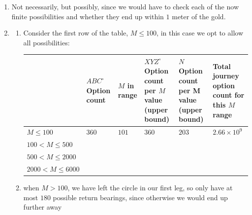 \documentclass{article}
\begin{document}
\begin{enumerate}
    Not all of these combinations will end up within $101$km of the start, but all those unique journeys that do are included here.

    Thus there are at most $360\times6000\times360\times203 \approx 1.58\times10^{11}$ unique final destinations within $101$km of the start.

    \item Not necessarily, but possibly, since we would have to check each of the now finite possibilities and whether they end up within $1$ meter of the gold.

    \item 

    \begin{enumerate}
        \item Consider the first row of the table, $M\leq100$, in this case we opt to allow all possibilities:

        \begin{table}[h]
\centering
\begin{tabularx}{\textwidth}{|l|X|X|X|X|X|}
\hline
 & $ABC^{\circ}$ Option count &  $M$ in range &  $XYZ^{\circ}$ Option count per $M$ value (upper bound) & $N$ Option count per M value (upper bound) & Total journey option count for this $M$ range \\
\hline
$M \le 100$            &  $360$ & $101$ & $360$ & $203$ & $2.66 \times 10^9$\\
\hline
$100 < M \le 500$      & & & & & \\
\hline
$500 < M \le 2000$     & & & & & \\
\hline
$2000 < M \le 6000$    & & & & & \\
\hline
\end{tabularx}
\end{table}


\item when $M>100$, we have left the circle in our first leg, so only have at most $180$ possible return bearings, since otherwise we would end up further away

\end{enumerate}
\end{enumerate}
\end{document}
